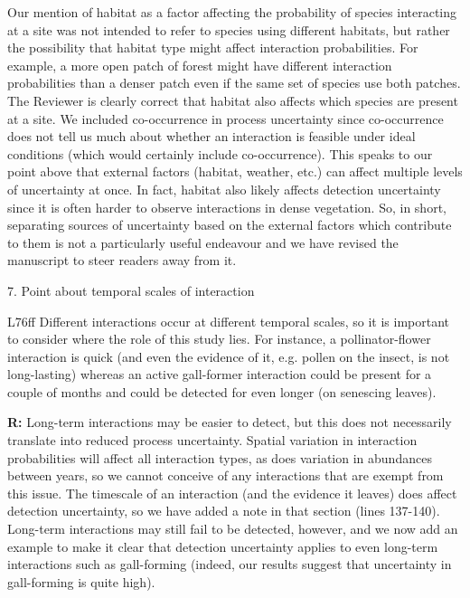 \documentclass[12pt]{letter}
\newenvironment{refquote}{\bigskip \begin{it}}{\end{it}\smallskip}
\begin{document}
		Our mention of habitat as a factor affecting the probability of species interacting at a site was not intended to refer to species using different habitats, but rather the possibility that habitat type might affect interaction probabilities. For example, a more open patch of forest might have different interaction probabilities than a denser patch even if the same set of species use both patches. The Reviewer is clearly correct that habitat also affects which species are present at a site. We included co-occurrence in process uncertainty since co-occurrence does not tell us much about whether an interaction is feasible under ideal conditions (which would certainly include co-occurrence). This speaks to our point above that external factors (habitat, weather, etc.) can affect multiple levels of uncertainty at once. In fact, habitat also likely affects detection uncertainty since it is often harder to observe interactions in dense vegetation. So, in short, separating sources of uncertainty based on the external factors which contribute to them is not a particularly useful endeavour and we have revised the manuscript to steer readers away from it.


	7. Point about temporal scales of interaction


		\begin{refquote}
		L76ff Different interactions occur at different temporal scales, so it is important to consider where the role of this study lies. For instance, a pollinator-flower interaction is quick (and even the evidence of it, e.g. pollen on the insect, is not long-lasting) whereas an active gall-former interaction could be present for a couple of months and could be detected for even longer (on senescing leaves).
		\end{refquote}


		\textbf{R:} Long-term interactions may be easier to detect, but this does not necessarily translate into reduced process uncertainty. Spatial variation in interaction probabilities will affect all interaction types, as does variation in abundances between years, so we cannot conceive of any interactions that are exempt from this issue. The timescale of an interaction (and the evidence it leaves) does affect detection uncertainty, so we have added a note in that section (lines 137-140). Long-term interactions may still fail to be detected, however, and we now add an example to make it clear that detection uncertainty applies to even long-term interactions such as gall-forming (indeed, our results suggest that uncertainty in gall-forming is quite high). 
\end{document}
